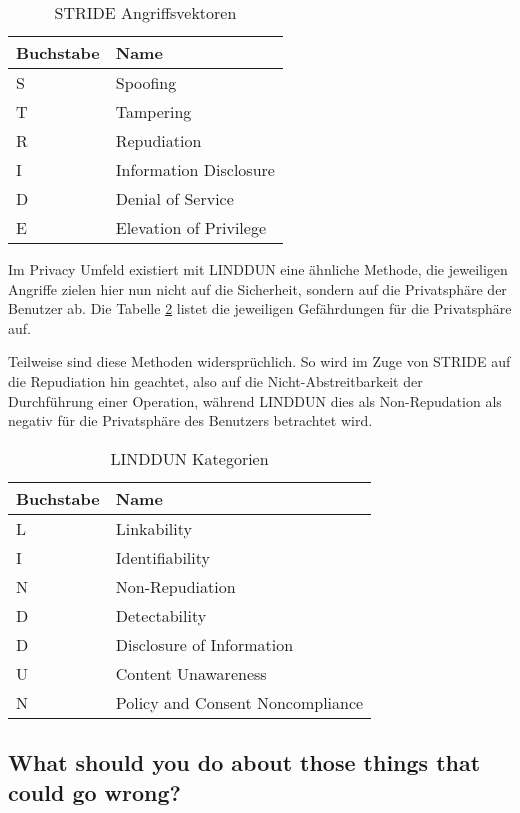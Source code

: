 \begin{table}
	\begin{center}
\begin{tabular}{lp{5cm}}
	\toprule
	Buchstabe & Name\\ \midrule
	S & Spoofing \\
	T & Tampering \\
	R & Repudiation \\
	I & Information Disclosure \\
	D & Denial of Service \\
	E & Elevation of Privilege \\
	\bottomrule
\end{tabular}
	\caption{STRIDE Angriffsvektoren}
	\label{tbl:stride}
\end{center}
\end{table}

Im Privacy Umfeld existiert mit LINDDUN eine ähnliche Methode, die jeweiligen Angriffe zielen hier nun nicht auf die Sicherheit, sondern auf die Privatsphäre der Benutzer ab. Die Tabelle \ref{tbl:linddun} listet die jeweiligen Gefährdungen für die Privatsphäre auf.

Teilweise sind diese Methoden widersprüchlich. So wird im Zuge von STRIDE auf die Repudiation hin geachtet, also auf die Nicht-Abstreitbarkeit der Durchführung einer Operation, während LINDDUN dies als Non-Repudation als negativ für die Privatsphäre des Benutzers betrachtet wird.

\begin{table}
	\begin{center}
\begin{tabular}{lp{5cm}}
	\toprule
	Buchstabe & Name\\
	\midrule
	L & Linkability \\
	I & Identifiability \\
	N & Non-Repudiation \\
	D & Detectability \\
	D & Disclosure of Information \\
	U & Content Unawareness \\
	N & Policy and Consent Noncompliance \\
	\bottomrule
\end{tabular}
	\caption{LINDDUN Kategorien}
	\label{tbl:linddun}
\end{center}
\end{table}

\subsection{What should you do about those things that could go wrong?}

